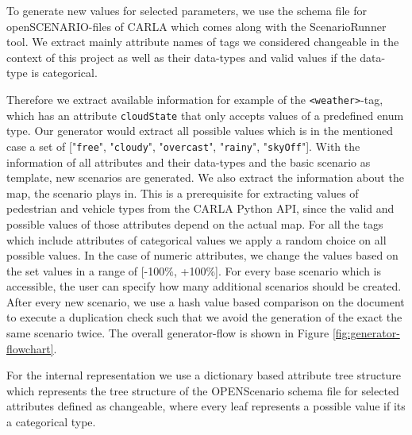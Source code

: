 \documentclass[conference, 11pt]{IEEEtran}
\begin{document}
To generate new values for selected parameters, we use the schema file for openSCENARIO-files of CARLA which comes along with the ScenarioRunner tool. We extract mainly attribute names of tags we considered changeable in the context of this project as well as their data-types and valid values if the data-type is categorical.

 Therefore we extract available information for example of the \texttt{<weather>}-tag, which has an attribute \texttt{cloudState} that only accepts values of a predefined enum type. Our generator would extract all possible values which is in the mentioned case a set of ["\texttt{free}", "\texttt{cloudy}", "\texttt{overcast}", "\texttt{rainy}", "\texttt{skyOff}"]. With the information of all attributes and their data-types and the basic scenario as template, new scenarios are generated. We also extract the information about the map, the scenario plays in. This is a prerequisite for extracting values of pedestrian and vehicle types from the CARLA Python API, since the valid and possible values of those attributes depend on the actual map.
 For all the tags which include attributes of categorical values we apply a random choice on all possible values. In the case of numeric attributes, we change the values based on the set values in a range of [-100\%, +100\%].
 For every base scenario which is accessible, the user can specify how many additional scenarios should be created. After every new scenario, we use a hash value based comparison on the document to execute a duplication check such that we avoid the generation of the exact the same scenario twice.
The overall generator-flow is shown in Figure \ref{fig:generator-flowchart}.

For the internal representation we use a dictionary based attribute tree structure which represents the tree structure of the OPENScenario schema file for selected attributes defined as changeable, where every leaf represents a possible value if its a categorical type.
\end{document}
